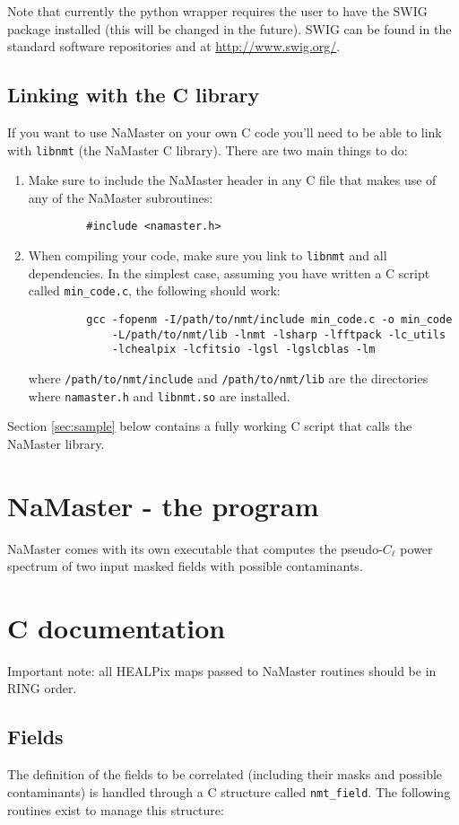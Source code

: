 \documentclass[a4paper,10pt]{article}
\begin{document}
Note that currently the python wrapper requires the user to have the SWIG package installed (this will be changed in the future). SWIG can be found in the standard software repositories and at \url{http://www.swig.org/}.

\subsection*{Linking with the C library}
If you want to use NaMaster on your own C code you'll need to be able to link with {\tt libnmt} (the NaMaster C library). There are two main things to do:
\begin{enumerate}
 \item Make sure to include the NaMaster header in any C file that makes use of any of the NaMaster subroutines:
       \begin{verbatim}
         #include <namaster.h>
       \end{verbatim}
 \item When compiling your code, make sure you link to {\tt libnmt} and all dependencies. In the simplest case, assuming you have written a C script called {\tt min\_code.c}, the following should work:
       \begin{verbatim}
         gcc -fopenm -I/path/to/nmt/include min_code.c -o min_code
             -L/path/to/nmt/lib -lnmt -lsharp -lfftpack -lc_utils
             -lchealpix -lcfitsio -lgsl -lgslcblas -lm
       \end{verbatim}
       where {\tt /path/to/nmt/include} and {\tt /path/to/nmt/lib} are the directories where {\tt namaster.h} and {\tt libnmt.so} are installed.
\end{enumerate}
Section \ref{sec:sample} below contains a fully working C script that calls the NaMaster library.

\section{NaMaster - the program}
NaMaster comes with its own executable that computes the pseudo-$C_\ell$ power spectrum of two input masked fields with possible contaminants.


\section{C documentation}
Important note: all HEALPix maps passed to NaMaster routines should be in RING order.

\subsection{Fields}
The definition of the fields to be correlated (including their masks and possible contaminants) is handled through a C structure called {\tt nmt\_field}. The following routines exist to manage this structure:
\end{document}

